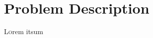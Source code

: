 \chapter{Problem Description}
\label{ch:ProblemDescription}



\lettrine[lraise=-0.1, lines=2, loversize=0.2]{L}{o}rem itsum
